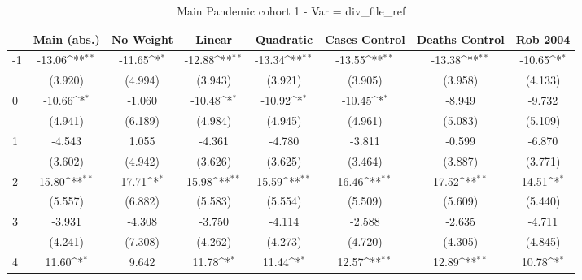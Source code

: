 \documentclass{article}
\begin{document}
{
\def\sym#1{\ifmmode^{#1}\else\(^{#1}\)\fi}
\begin{longtable}{l*{7}{c}}
\caption{Main Pandemic cohort 1 - Var = div\_file\_ref}\\
\hline\hline\endfirsthead\hline\endhead\hline\endfoot\endlastfoot
                &\multicolumn{1}{c}{Main (abs.)}&\multicolumn{1}{c}{No Weight}&\multicolumn{1}{c}{Linear}&\multicolumn{1}{c}{Quadratic}&\multicolumn{1}{c}{Cases Control}&\multicolumn{1}{c}{Deaths Control}&\multicolumn{1}{c}{Rob 2004}\\
\hline
-1              &   -13.06\sym{**} &   -11.65\sym{*}  &   -12.88\sym{**} &   -13.34\sym{**} &   -13.55\sym{**} &   -13.38\sym{**} &   -10.65\sym{*}  \\
                &  (3.920)         &  (4.994)         &  (3.943)         &  (3.921)         &  (3.905)         &  (3.958)         &  (4.133)         \\
0               &   -10.66\sym{*}  &   -1.060         &   -10.48\sym{*}  &   -10.92\sym{*}  &   -10.45\sym{*}  &   -8.949         &   -9.732         \\
                &  (4.941)         &  (6.189)         &  (4.984)         &  (4.945)         &  (4.961)         &  (5.083)         &  (5.109)         \\
1               &   -4.543         &    1.055         &   -4.361         &   -4.780         &   -3.811         &   -0.599         &   -6.870         \\
                &  (3.602)         &  (4.942)         &  (3.626)         &  (3.625)         &  (3.464)         &  (3.887)         &  (3.771)         \\
2               &    15.80\sym{**} &    17.71\sym{*}  &    15.98\sym{**} &    15.59\sym{**} &    16.46\sym{**} &    17.52\sym{**} &    14.51\sym{*}  \\
                &  (5.557)         &  (6.882)         &  (5.583)         &  (5.554)         &  (5.509)         &  (5.609)         &  (5.440)         \\
3               &   -3.931         &   -4.308         &   -3.750         &   -4.114         &   -2.588         &   -2.635         &   -4.711         \\
                &  (4.241)         &  (7.308)         &  (4.262)         &  (4.273)         &  (4.720)         &  (4.305)         &  (4.845)         \\
4               &    11.60\sym{*}  &    9.642         &    11.78\sym{*}  &    11.44\sym{*}  &    12.57\sym{**} &    12.89\sym{**} &    10.78\sym{*}  \\

\end{longtable}}
\end{document}

